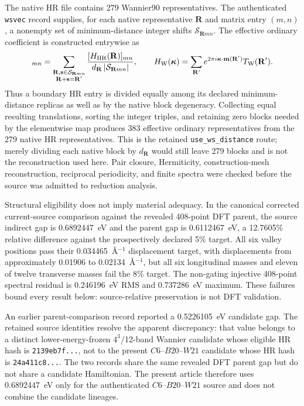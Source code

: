 \documentclass[11pt]{article}
\theoremstyle{definition}
\newcommand{\Rvec}{\mathbf R}
\begin{document}
The native HR file contains 279 Wannier90 representatives.  The authenticated
\texttt{wsvec} record supplies, for each native representative $\Rvec$ and matrix entry
$(m,n)$, a nonempty set of minimum-distance integer shifts
$\mathcal S_{\Rvec mn}$.  The effective ordinary coefficient is constructed entrywise as
\begin{equation}
 [T_{\rm W}(\Rvec')]_{mn}
 =\sum_{\substack{\Rvec,\mathbf s\in\mathcal S_{\Rvec mn}\\
                   \Rvec+\mathbf s=\Rvec'}}
 \frac{[H_{\rm HR}(\Rvec)]_{mn}}
 {d_{\Rvec}\,|\mathcal S_{\Rvec mn}|},
 \qquad
 H_{\rm W}(\boldsymbol\kappa)=
 \sum_{\Rvec'}e^{2\pi i\boldsymbol\kappa\cdot\mathbf m(\Rvec')}
 T_{\rm W}(\Rvec').
 \label{eq:native-wannier-reconstruction}
\end{equation}
Thus a boundary HR entry is divided equally among its declared minimum-distance replicas
as well as by the native block degeneracy.  Collecting equal resulting translations,
sorting the integer triples, and retaining zero blocks needed by the elementwise map
produces 383 effective ordinary representatives from the 279 native HR representatives.
This is the retained \texttt{use\_ws\_distance} route; merely dividing each native block
by $d_{\Rvec}$ would still leave 279 blocks and is not the reconstruction used here.
Pair closure, Hermiticity, construction-mesh
reconstruction, reciprocal periodicity, and finite spectra were checked before the
source was admitted to reduction analysis.

Structural eligibility does not imply material adequacy.  In the canonical corrected
current-source comparison against the revealed 408-point DFT parent, the source indirect
gap is 0.6892447~eV and the parent gap is 0.6112467~eV, a 12.7605\% relative difference
against the prospectively declared 5\% target.  All six valley positions pass their
0.034465~\AA$^{-1}$ displacement target, with displacements from approximately 0.01906
to 0.02134~\AA$^{-1}$, but all six longitudinal masses and eleven of twelve transverse
masses fail the 8\% target.  The non-gating injective 408-point spectral residual is
0.246196~eV RMS and 0.737286~eV maximum.  These failures bound every result below:
source-relative preservation is not DFT validation.

An earlier parent-comparison record reported a 0.5226105~eV candidate gap.  The retained
source identities resolve the apparent discrepancy: that value belongs to a distinct
lower-energy-frozen $4^3$/12-band Wannier candidate whose eligible HR hash is
\texttt{2139eb7f...}, not to the present $C6$--$B20$--$W21$ candidate whose HR hash is
\texttt{24a411c8...}.  The two records share the same revealed DFT parent gap but do not
share a candidate Hamiltonian.  The present article therefore uses 0.6892447~eV only for
the authenticated $C6$--$B20$--$W21$ source and does not combine the candidate lineages.
\end{document}
